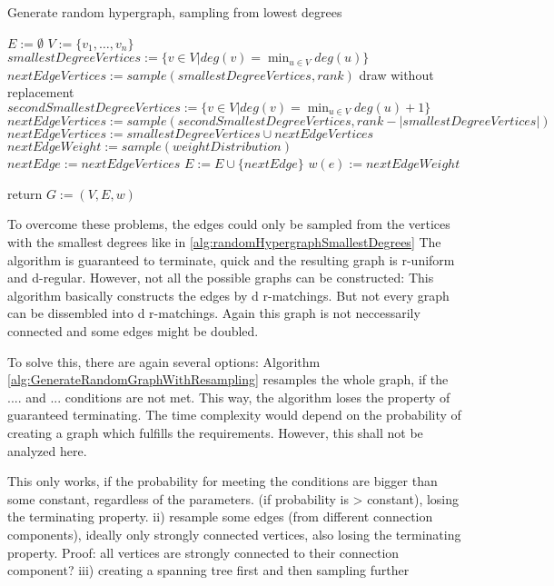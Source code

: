 \begin{algorithm}
	\caption{Generate random hypergraph, sampling from lowest degrees\label{alg:randomHypergraphSmallestDegrees}} 
	\begin{algorithmic}
		\State $E := \emptyset$
		\State $V := \{v_1, \ldots, v_n\}$
		\State $ smallestDegreeVertices := \{v\in V| deg(v) = \min_{u\in V} deg(u) \}$
		\State $nextEdgeVertices := sample(smallestDegreeVertices, rank) $ \Comment draw without replacement
		\Else
		\State $secondSmallestDegreeVertices := \{v\in V| deg(v) = \min_{u\in V} deg(u) +1 \}$
		\State $nextEdgeVertices :=  sample(secondSmallestDegreeVertices, rank - | smallestDegreeVertices|)$
		\State $nextEdgeVertices := smallestDegreeVertices \cup nextEdgeVertices  $
		\EndIf
		\State $nextEdgeWeight := sample(weightDistribution)$ 
		\State $nextEdge := nextEdgeVertices$
		\State $E := E \cup \{nextEdge\}$
		\State $w(e):= nextEdgeWeight$
		
		\EndWhile
		\State return $G:=(V,E, w)$	
		\EndFunction 
	\end{algorithmic}
\end{algorithm}	
To overcome these problems, the edges could only be sampled from the vertices with the smallest degrees like in \cref{alg:randomHypergraphSmallestDegrees}
The algorithm is guaranteed to terminate, quick and the resulting graph is r-uniform and d-regular.
However, not all the possible graphs can be constructed: This algorithm basically constructs the edges by d r-matchings. But not every graph can be dissembled into d r-matchings.
Again this graph is not neccessarily connected and some edges might be doubled.

To solve this, there are again several options:
Algorithm \ref{alg:GenerateRandomGraphWithResampling}  resamples the whole graph, if the .... and ... conditions are not met. This way, the algorithm loses the property of guaranteed terminating. The time complexity would depend on the probability of creating a graph which fulfills the requirements. However, this shall not be analyzed here.


This only works, if the probability for meeting the conditions are bigger than some constant, regardless of the parameters.
(if probability is > constant), losing the terminating property.
ii) resample some edges (from different connection components), ideally only strongly connected vertices, also losing the terminating property. Proof: all vertices are strongly connected to their connection component?
iii) creating a spanning tree first and then sampling further


